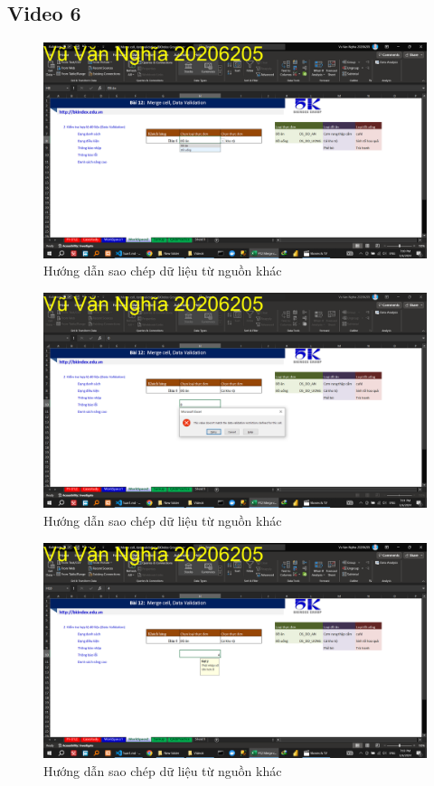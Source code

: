 \documentclass{article}
\begin{document}
\subsection{Video 6}
\begin{figure}[H]
    \centering
    \includegraphics[scale = 0.15]{Video6/HuongDan/0.png}
    \caption{Hướng dẫn sao chép dữ liệu từ nguồn khác}
    \end{figure}

    
\begin{figure}[H]
    \centering
    \includegraphics[scale = 0.15]{Video6/HuongDan/1.png}
    \caption{Hướng dẫn sao chép dữ liệu từ nguồn khác}
    \end{figure}

    
\begin{figure}[H]
    \centering
    \includegraphics[scale = 0.15]{Video6/HuongDan/2.png}
    \caption{Hướng dẫn sao chép dữ liệu từ nguồn khác}
    \end{figure}
\end{document}
